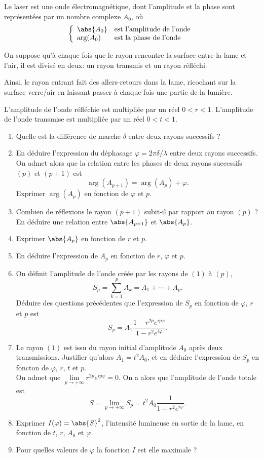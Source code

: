 \documentclass{article}
\renewcommand{\phi}{\varphi}
\begin{document}
Le laser est une onde électromagnétique, dont l'amplitude et la phase sont représentées par un nombre complexe $A_0$, où
\begin{equation*}
	\left\{
	\begin{array}{ll}
	\abs{A_0} &\text{est l'amplitude de l'onde}\\
	\arg(A_0) &\text{est la phase de l'onde}
	\end{array}\right.
\end{equation*}

On suppose qu'à chaque fois que le rayon rencontre la surface entre la lame et l'air, il est divisé en deux: un rayon transmis et un rayon réfléchi. 

Ainsi, le rayon entrant fait des allers-retours dans la lame, ricochant sur la surface verre/air en laissant passer à chaque fois une partie de la lumière.

L'amplitude de l'onde réfléchie est multipliée par un réel $0 < r < 1$. L'amplitude de l'onde transmise est multipliée par un réel $0< t < 1$.

\begin{enumerate}
	\item Quelle est la différence de marche $\delta$ entre deux rayons successifs ?
	\item En déduire l'expression du déphasage $\phi = 2\pi\delta/\lambda$ entre deux rayons successifs.
	\\
	On admet alors que la relation entre les phases de deux rayons successifs $(p)$ et $(p+1)$ est
	\[ \arg(A_{p+1}) = \arg(A_p) + \phi. \]
	Exprimer $\arg(A_p)$ en fonction de $\phi$ et $p$.
	\item Combien de réflexions le rayon $(p+1)$ subit-il par rapport au rayon $(p)$ ? En déduire une relation entre $\abs{A_{p+1}}$ et $\abs{A_p}$.
	\item Exprimer $\abs{A_p}$ en fonction de $r$ et $p$.
	\item En déduire l'expression de $A_p$ en fonction de $r$, $\phi$ et $p$.
	\item On définit l'amplitude de l'onde créée par les rayons de $(1)$ à $(p)$,
		\[ S_p = \sum_{k=1}^{p}A_k = A_1 + \cdots + A_p. \]
	Déduire des questions précédentes que l'expression de $S_p$ en fonction de $\phi$, $r$ et $p$ est
		\[ S_p = A_1\frac{1-r^{2p}e^{ip\phi}}{1-r^2e^{i\phi}}. \]
	\item Le rayon $(1)$ est issu du rayon initial d'amplitude $A_0$ après deux transmissions. Justifier qu'alors $A_1 = t^2A_0$, et en déduire l'expression de $S_p$ en foncton de $\phi$, $r$, $t$ et $p$.
	\\
	On admet que $\lim\limits_{p\to+\infty}r^{2p}e^{ip\phi} = 0$. On a alors que l'amplitude de l'onde totale est
		\[ S = \lim_{p\to+\infty}S_p = t^2A_0\frac{1}{1-r^2e^{i\phi}}. \]
	\item Exprimer $I(\phi) = \abs{S}^2$, l'intensité lumineuse en sortie de la lame, en fonction de $t$, $r$, $A_0$ et $\phi$.
	\item Pour quelles valeurs de $\phi$ la fonction $I$ est elle maximale ?
\end{enumerate}
\end{document}
